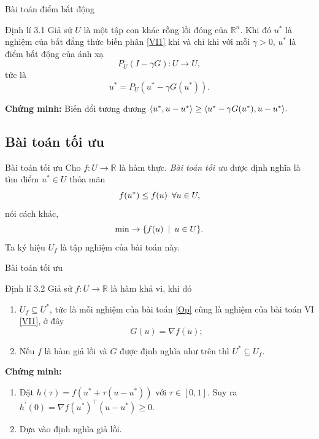 \documentclass[aspectratio=169]{beamer}
\DeclarePairedDelimiter{\pro}{\langle}{\rangle}
\theoremstyle{plain}
\theoremstyle{definition}
\theoremstyle{remark}
\begin{document}
\begin{frame}{Bài toán điểm bất động}
\begin{block}{Định lí 3.1}
Giả sử $U$ là một tập con khác rỗng lồi đóng của $\mathbb{R}^n$. Khi đó $u^*$ là nghiệm của bất đẳng thức biến phân \eqref{VI1} khi và chỉ khi với mỗi $\gamma>0$, $u^*$ là điểm bất động của ánh xạ
	$$
	P_U(I-\gamma G): U \rightarrow U, 
	$$
	tức là
	\begin{equation*}
	u^* =  P_U(u^*-\gamma G(u^*)).
	\end{equation*}
\end{block}
\textbf{Chứng minh:} Biến đổi tương đương $\pro{u^*,u-u^*}\geq\pro{u^*-\gamma G(u^*),u-u^*}.$
\end{frame}
\subsection{Bài toán tối ưu}
\begin{frame}{Bài toán tối ưu}\pause
Cho $f: U\to \mathbb{R}$ là hàm thực. \textit{Bài toán tối ưu} được định nghĩa là tìm điểm $u^*\in U$ thỏa mãn
$$
f(u^*)\leq f(u)\enskip\forall u\in U,
$$
nói cách khác, 
\begin{equation}
    \min\to\{f(u)\enskip|\enskip u\in U\}. \label{Op}
\end{equation}
Ta ký hiệu $U_f$ là tập nghiệm của bài toán này.
\end{frame}

\begin{frame}{Bài toán tối ưu}
\begin{block}{Định lí 3.2}
Giả sử $f: U\to\mathbb{R}$ là hàm khả vi, khi đó 
\begin{enumerate}
    \item $U_f\subseteq U^*$, tức là mỗi nghiệm của bài toán \eqref{Op} cũng là nghiệm của bài toán VI \eqref{VI1}, ở đây
    \begin{equation*}
        G(u)=\nabla f(u);
    \end{equation*}
    \item Nếu $f$ là hàm giả lồi và $G$ được định nghĩa như trên thì $U^*\subseteq U_f$.
\end{enumerate}
\end{block}
\textbf{Chứng minh:}
\begin{enumerate}
    \item Đặt $h(\tau) = f(u^*+\tau(u-u^*))$ với $\tau\in[0,1]$. Suy ra $h^\prime(0)=\nabla f(u^*)^\top(u-u^*)\geq 0.$
    \item Dựa vào định nghĩa giả lồi.
\end{enumerate}
\end{frame}
\end{document}
